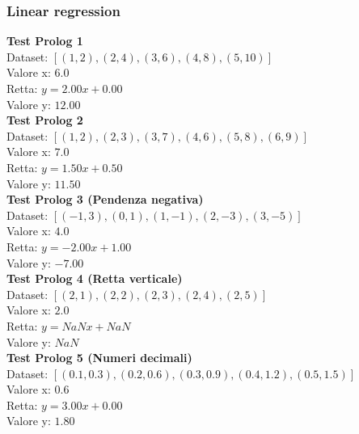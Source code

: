 \documentclass[11pt]{article}
\theoremstyle{definition}
\begin{document}
\subsubsection{Linear regression}
\noindent
\textbf{Test Prolog 1}\\
Dataset: $[(1, 2), (2, 4), (3, 6), (4, 8), (5, 10)]$\\
Valore x: $6.0$\\
Retta: $y = 2.00x + 0.00$\\
Valore y: $12.00$\\
\newline
\textbf{Test Prolog 2}\\
Dataset: $[(1, 2), (2, 3), (3, 7), (4, 6), (5, 8), (6, 9)]$\\
Valore x: $7.0$\\
Retta: $y = 1.50x + 0.50$\\
Valore y: $11.50$\\
\newline
\textbf{Test Prolog 3 (Pendenza negativa)}\\
Dataset: $[(-1, 3), (0, 1), (1, -1), (2, -3), (3, -5)]$\\
Valore x: $4.0$\\
Retta: $y = -2.00x + 1.00$\\
Valore y: $-7.00$\\
\newline
\textbf{Test Prolog 4 (Retta verticale)}\\
Dataset: $[(2, 1), (2, 2), (2, 3), (2, 4), (2, 5)]$\\
Valore x: $2.0$\\
Retta: $y = NaNx + NaN$\\
Valore y: $NaN$\\
\newline
\textbf{Test Prolog 5 (Numeri decimali)}\\
Dataset: $[(0.1, 0.3), (0.2, 0.6), (0.3, 0.9), (0.4, 1.2), (0.5, 1.5)]$\\
Valore x: $0.6$\\
Retta: $y = 3.00x + 0.00$\\
Valore y: $1.80$
\end{document}
